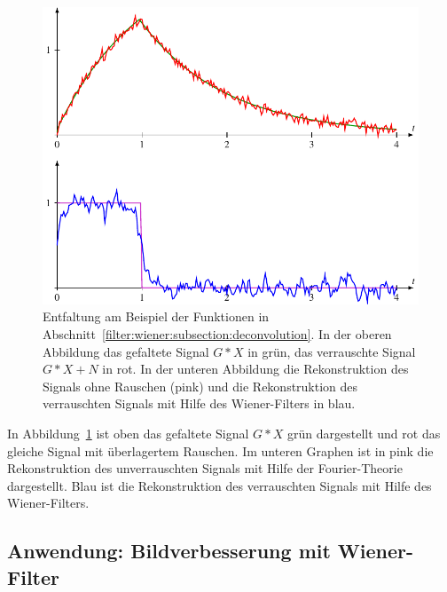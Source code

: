 \begin{figure}
\centering
\includegraphics{8-filter/images/filterung.pdf}
\caption{Entfaltung am Beispiel der Funktionen in
Abschnitt~\ref{filter:wiener:subsection:deconvolution}.
In der oberen Abbildung das gefaltete Signal $G*X$ in grün,
das verrauschte Signal $G*X+N$ in rot.
In der unteren Abbildung die Rekonstruktion des Signals ohne
Rauschen (pink) und die Rekonstruktion des verrauschten Signals
mit Hilfe des Wiener-Filters in blau.
\label{filter:wiener:rekonstruktion}}
\end{figure}
In Abbildung~\ref{filter:wiener:rekonstruktion} ist oben das 
gefaltete Signal $G*X$ grün dargestellt und rot das gleiche Signal
mit überlagertem Rauschen.
Im unteren Graphen ist in pink die Rekonstruktion des unverrauschten
Signals mit Hilfe der Fourier-Theorie dargestellt.
Blau ist die Rekonstruktion des verrauschten Signals mit Hilfe
des Wiener-Filters.

\subsection{Anwendung: Bildverbesserung mit Wiener-Filter
\label{filter:wiener:subsection:bildverbesserung}}

